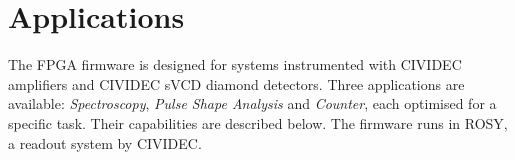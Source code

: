 \documentclass[12pt]{mytustyle}  %
\begin{document}


\clearpage
\section{Applications}
\label{sec:applications}

The FPGA firmware is designed for systems instrumented with CIVIDEC amplifiers and CIVIDEC sVCD diamond detectors. Three applications are available: \emph{Spectroscopy}, \emph{Pulse Shape Analysis} and \emph{Counter}, each optimised for a specific task. Their capabilities are described below. The firmware runs in ROSY, a readout system by CIVIDEC.
\end{document}
